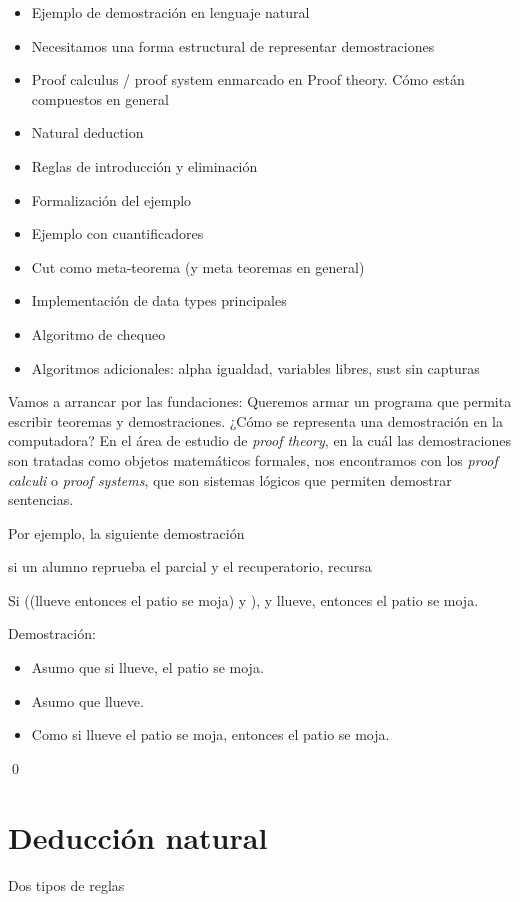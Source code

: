 \begin{itemize}
    \item Ejemplo de demostración en lenguaje natural
    \item Necesitamos una forma estructural de representar demostraciones
    \item Proof calculus / proof system enmarcado en Proof theory. Cómo están
    compuestos en general
    \item Natural deduction
    \item Reglas de introducción y eliminación
    \item Formalización del ejemplo
    \item Ejemplo con cuantificadores
    \item Cut como meta-teorema (y meta teoremas en general)
    \item Implementación de data types principales
    \item Algoritmo de chequeo
    \item Algoritmos adicionales: alpha igualdad, variables libres, sust sin capturas
\end{itemize}

Vamos a arrancar por las fundaciones: Queremos armar un programa que permita
escribir teoremas y demostraciones. ¿Cómo se representa una demostración en la
computadora? En el área de estudio de \textit{proof theory}, en la cuál las
demostraciones son tratadas como objetos matemáticos formales, nos encontramos
con los \textit{proof calculi} o \textit{proof systems}, que son sistemas
lógicos que permiten demostrar sentencias.

Por ejemplo, la siguiente demostración

si un alumno reprueba el parcial y el recuperatorio, recursa


\begin{ejemplo}
    Si ((llueve entonces el patio se moja) y ), y llueve, entonces el patio se moja.

    Demostración:
\begin{itemize}
    \item Asumo que si llueve, el patio se moja.
    \item Asumo que llueve.
    \item Como si llueve el patio se moja, entonces el patio se moja.
\end{itemize}
    \qed
\end{ejemplo}

\section{Deducción natural}
Dos tipos de reglas

